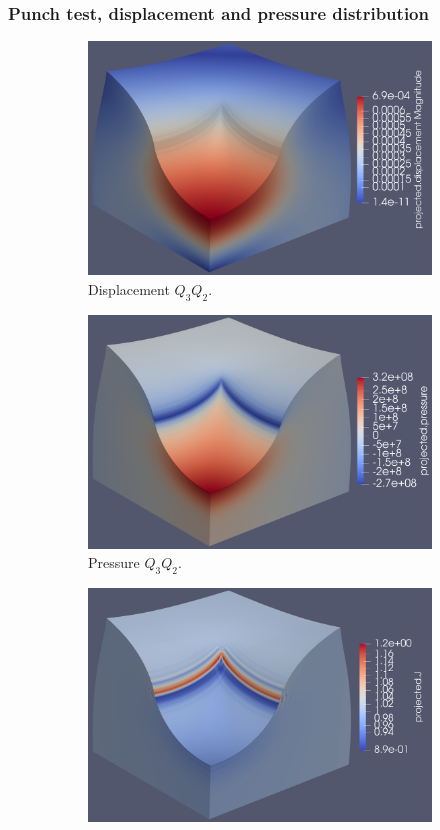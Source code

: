 \documentclass{beamer}
\begin{document}
\begin{frame}
	\frametitle{Punch test, displacement and pressure distribution}
	\begin{figure}[H]
		\begin{subfigure}{.5\textwidth}
			\centering
			\includegraphics[width=.68\textwidth]{../figs/u-Q3Q2-320MPa-0.5.png}
			\caption{Displacement $Q_3Q_2$.}
		\end{subfigure}%
		\begin{subfigure}{.5\textwidth}
			\centering
			\includegraphics[width=.68\textwidth]{../figs/p-Q3Q2-320MPa-0.5.png}
			\caption{Pressure $Q_3Q_2$.}
		\end{subfigure}
		\begin{subfigure}{.5\textwidth}
			\centering
			\includegraphics[width=.68\textwidth]{../figs/J-Q3Q2-320MPa-0.495.png}

\end{subfigure}
\end{figure}
\end{frame}
\end{document}
